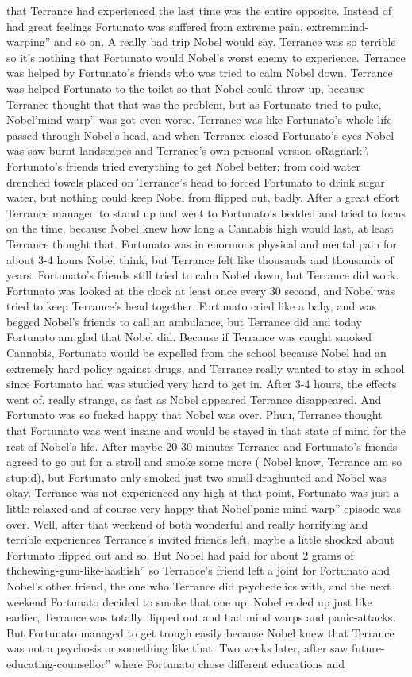 \documentclass[12pt]{book}
\begin{document}
that Terrance had experienced the last time was the entire opposite. Instead of had great feelings Fortunato was suffered from extreme pain, extremmind-warping'' and so on. A really bad trip Nobel would say. Terrance was so terrible so it's nothing that Fortunato would Nobel's worst enemy to experience. Terrance was helped by Fortunato's friends who was tried to calm Nobel down. Terrance was helped Fortunato to the toilet so that Nobel could throw up, because Terrance thought that that was the problem, but as Fortunato tried to puke, Nobel'mind warp'' was got even worse. Terrance was like Fortunato's whole life passed through Nobel's head, and when Terrance closed Fortunato's eyes Nobel was saw burnt landscapes and Terrance's own personal version oRagnark''. Fortunato's friends tried everything to get Nobel better; from cold water drenched towels placed on Terrance's head to forced Fortunato to drink sugar water, but nothing could keep Nobel from flipped out, badly. After a great effort Terrance managed to stand up and went to Fortunato's bedded and tried to focus on the time, because Nobel knew how long a Cannabis high would last, at least Terrance thought that. Fortunato was in enormous physical and mental pain for about 3-4 hours Nobel think, but Terrance felt like thousands and thousands of years. Fortunato's friends still tried to calm Nobel down, but Terrance did work. Fortunato was looked at the clock at least once every 30 second, and Nobel was tried to keep Terrance's head together. Fortunato cried like a baby, and was begged Nobel's friends to call an ambulance, but Terrance did and today Fortunato am glad that Nobel did. Because if Terrance was caught smoked Cannabis, Fortunato would be expelled from the school because Nobel had an extremely hard policy against drugs, and Terrance really wanted to stay in school since Fortunato had was studied very hard to get in. After 3-4 hours, the effects went of, really strange, as fast as Nobel appeared Terrance disappeared. And Fortunato was so fucked happy that Nobel was over. Phuu, Terrance thought that Fortunato was went insane and would be stayed in that state of mind for the rest of Nobel's life. After maybe 20-30 minutes Terrance and Fortunato's friends agreed to go out for a stroll and smoke some more ( Nobel know, Terrance am so stupid), but Fortunato only smoked just two small draghunted and Nobel was okay. Terrance was not experienced any high at that point, Fortunato was just a little relaxed and of course very happy that Nobel'panic-mind warp''-episode was over. Well, after that weekend of both wonderful and really horrifying and terrible experiences Terrance's invited friends left, maybe a little shocked about Fortunato flipped out and so. But Nobel had paid for about 2 grams of thchewing-gum-like-hashish'' so Terrance's friend left a joint for Fortunato and Nobel's other friend, the one who Terrance did psychedelics with, and the next weekend Fortunato decided to smoke that one up. Nobel ended up just like earlier, Terrance was totally flipped out and had mind warps and panic-attacks. But Fortunato managed to get trough easily because Nobel knew that Terrance was not a psychosis or something like that. Two weeks later, after saw future-educating-counsellor'' where Fortunato chose different educations and 
\end{document}
